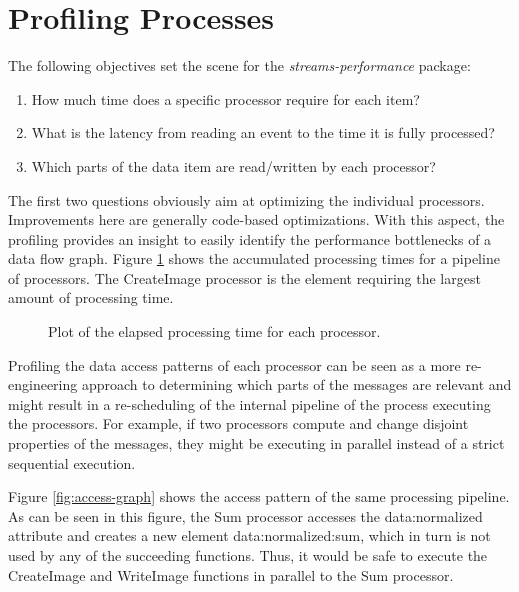 \documentclass[german,a4]{scrartcl}
\begin{document}
\section{Profiling Processes}
The following objectives set the scene for the {\em streams-performance} package:
\begin{enumerate}
\item How much time does a specific processor require for each item?
\item What is the latency from reading an event to the time it is fully processed?
\item Which parts of the data item are read/written by each processor?
\end{enumerate}

The first two questions obviously aim at optimizing the individual processors. Improvements
here are generally code-based optimizations. With this aspect, the profiling provides an 
insight to easily identify the performance bottlenecks of a data flow graph. 
Figure \ref{fig:performancePlot} shows the accumulated processing times for a pipeline of
processors. The {\ttfamily CreateImage} processor is the element requiring the largest
amount of processing time.

\begin{figure}[h!]
\centering

\caption{\label{fig:performancePlot}Plot of the elapsed processing time for each processor.}
\end{figure}

Profiling the data access patterns of each processor can be seen as a more re-engineering
approach to determining which parts of the messages are relevant and might result in a
re-scheduling of the internal pipeline of the process executing the processors. For example,
if two processors compute and change disjoint properties of the messages, they might be
executing in parallel instead of a strict sequential execution.

Figure \ref{fig:access-graph} shows the access pattern of the same processing pipeline. As
can be seen in this figure, the {\ttfamily Sum} processor accesses the {\ttfamily data:normalized}
attribute and creates a new element {\ttfamily data:normalized:sum},
which in turn is not used by any of the succeeding functions. Thus, it would be safe to execute
the {\ttfamily CreateImage} and {\ttfamily WriteImage} functions in parallel to the {\ttfamily Sum}
processor.
\end{document}
